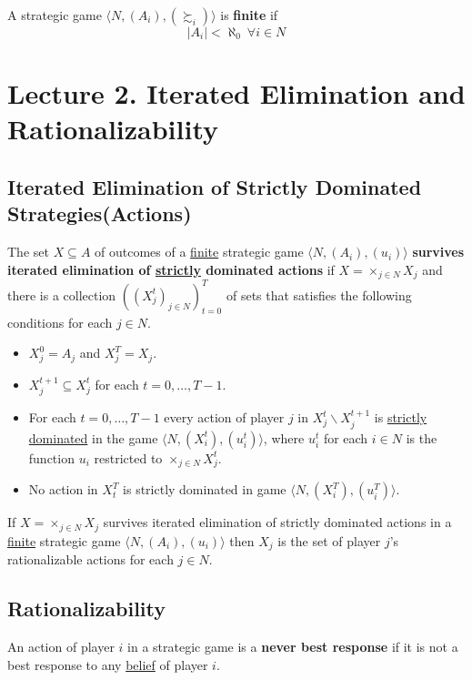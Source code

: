 \documentclass[11pt]{article}
\begin{document}
		\begin{definition}[pg.11]
			A strategic game $\langle N, (A_i), (\succsim_i) \rangle$ is \textbf{finite} if 
			\[
				|A_i| < \aleph_0\ \forall i \in N
			\]
		\end{definition}
		
	\section{Lecture 2. Iterated Elimination and Rationalizability}
		\subsection{Iterated Elimination of Strictly Dominated Strategies(Actions)}
			\begin{definition}[60.2]
				The set $X \subseteq A$ of outcomes of a \ul{finite} strategic game $\langle N, (A_i), (u_i) \rangle$ \textbf{survives iterated elimination of \ul{strictly} dominated actions} if $X = \times_{j \in N} X_j$ and there is a collection $((X_j^t)_{j \in N})_{t=0}^T$ of sets that satisfies the following conditions for each $j \in N$.
				\begin{itemize}
					\item $X_j^0 = A_j$ and $X_j^T = X_j$.
					\item $X_j^{t+1} \subseteq X_j^t$ for each $t = 0, \dots, T - 1$.
					\item For each $t = 0, \dots, T-1$ every action of player $j$ in $X_j^t \backslash X_j^{t+1}$ is \ul{strictly dominated} in the game $\langle N, (X_i^t), (u_i^t) \rangle$, where $u_i^t$ for each $i \in N$ is the function $u_i$ restricted to $\times_{j \in N} X_j^t$.
					\item No action in $X_t^T$ is strictly dominated in game $\langle N, (X_i^T), (u_i^T) \rangle$.
				\end{itemize}
			\end{definition}
			
			\begin{proposition}[61.2]
				If $X = \times_{j \in N}X_j$ survives iterated elimination of strictly dominated actions in a \ul{finite} strategic game $\langle N, (A_i), (u_i) \rangle$ then $X_j$ is the set of player $j$'s rationalizable actions for each $j \in N$.
			\end{proposition}
			
		\subsection{Rationalizability}
			\begin{definition}[59.1]
				An action of player $i$ in a strategic game is a \textbf{never best response} if it is not a best response to any \ul{belief} of player $i$.
			\end{definition}
			
\end{document}
